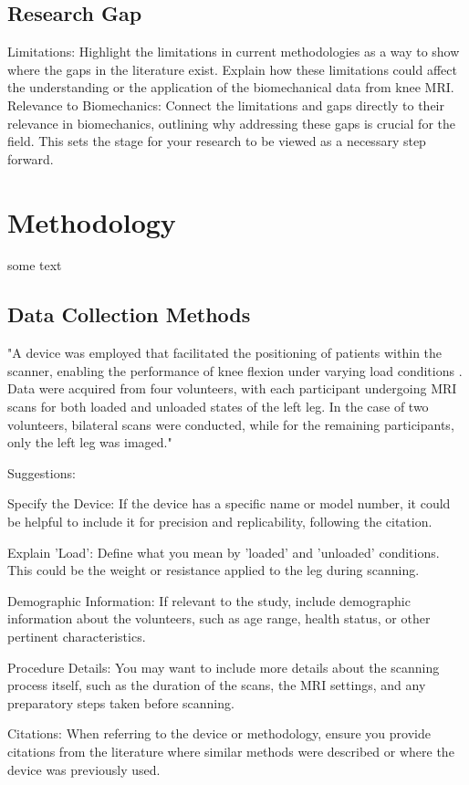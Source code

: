 \documentclass{micro-econ-thesis}
\begin{document}
\subsection{Research Gap}
Limitations: Highlight the limitations in current methodologies as a way to show where the gaps in the literature exist. Explain how these limitations could affect the understanding or the application of the biomechanical data from knee MRI.
Relevance to Biomechanics: Connect the limitations and gaps directly to their relevance in biomechanics, outlining why addressing these gaps is crucial for the field. This sets the stage for your research to be viewed as a necessary step forward.

\section{Methodology}
\label{sec:second}
some text 
\subsection{Data Collection Methods}
"A device was employed that facilitated the positioning of patients within the scanner, enabling the performance of knee flexion under varying load conditions \parencite{brisson_novel_2022}. Data were acquired from four volunteers, with each participant undergoing MRI scans for both loaded and unloaded states of the left leg. In the case of two volunteers, bilateral scans were conducted, while for the remaining participants, only the left leg was imaged."

Suggestions:

Specify the Device: If the device has a specific name or model number, it could be helpful to include it for precision and replicability, following the citation.

Explain 'Load': Define what you mean by 'loaded' and 'unloaded' conditions. This could be the weight or resistance applied to the leg during scanning.

Demographic Information: If relevant to the study, include demographic information about the volunteers, such as age range, health status, or other pertinent characteristics.

Procedure Details: You may want to include more details about the scanning process itself, such as the duration of the scans, the MRI settings, and any preparatory steps taken before scanning.

Citations: When referring to the device or methodology, ensure you provide citations from the literature where similar methods were described or where the device was previously used.
\end{document}
